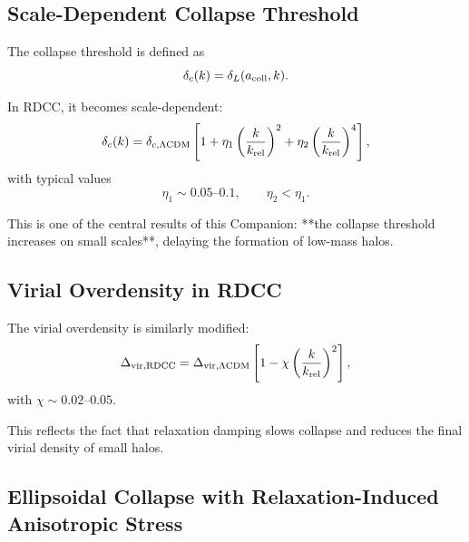 \documentclass[11pt,a4paper]{article}
\begin{document}
\subsection{Scale-Dependent Collapse Threshold}

The collapse threshold is defined as
\begin{equation}
\delta_c(k)
= \delta_L(a_{\rm coll},k).
\end{equation}

In RDCC, it becomes scale-dependent:
\begin{equation}
\delta_c(k)
= \delta_{c,\Lambda{\rm CDM}}
\left[
1 + \eta_1\left(\frac{k}{k_{\rm rel}}\right)^2
+ \eta_2\left(\frac{k}{k_{\rm rel}}\right)^4
\right],
\end{equation}
with typical values
\begin{equation}
\eta_1 \sim 0.05\text{--}0.1,
\qquad
\eta_2 < \eta_1.
\end{equation}

This is one of the central results of this Companion:  
**the collapse threshold increases on small scales**, delaying the formation of low-mass halos.

\subsection{Virial Overdensity in RDCC}

The virial overdensity is similarly modified:
\begin{equation}
\Delta_{\rm vir,RDCC}
= \Delta_{\rm vir,\Lambda CDM}
\left[
1 - \chi\left(\frac{k}{k_{\rm rel}}\right)^2
\right],
\end{equation}
with $\chi \sim 0.02$–$0.05$.

This reflects the fact that relaxation damping slows collapse and reduces the final virial
density of small halos.

\subsection{Ellipsoidal Collapse with Relaxation-Induced Anisotropic Stress}
\end{document}
